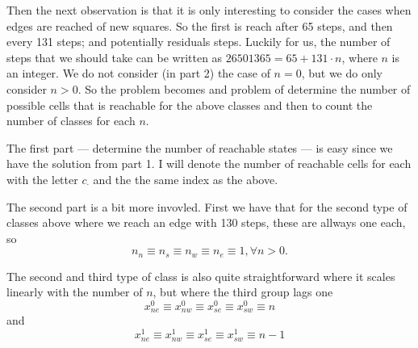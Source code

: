 \documentclass[]{article}
\begin{document}
Then the next observation is that it is only interesting to consider the cases when edges are reached of new squares. So the first is reach after 65 steps, and then every 131 steps; and potentially residuals steps. Luckily for us, the number of steps that we should take can be written as $26501365 = 65 + 131\cdot n$, where $n$ is an integer. We do not consider (in part 2) the case of $n=0$, but we do only consider $n>0$. So the problem becomes and problem of determine the number of possible cells that is reachable for the above classes and then to count the number of classes for each $n$. 

The first part --- determine the number of reachable states --- is easy since we have the solution from part 1. I will denote the number of reachable cells for each with the letter $c_{\cdot}$ and the the same index as the above. 

 The second part is a bit more invovled. First we have that for the second type of classes above where we reach an edge with 130 steps, these are allways one each, so 
\begin{equation}
     n_n\equiv n_s\equiv n_w\equiv n_e\equiv 1, \forall n>0. 
\end{equation}

The second and third type of class is also quite straightforward where it scales linearly with the number of $n$, but where the third group lags one
\begin{equation}
    x_{ne}^0\equiv x_{nw}^0\equiv x_{se}^0\equiv x_{sw}^0 \equiv n     
\end{equation}
and 
\begin{equation}
    x_{ne}^1\equiv x_{nw}^1\equiv x_{se}^1\equiv x_{sw}^1 \equiv n - 1
\end{equation}
\end{document}
